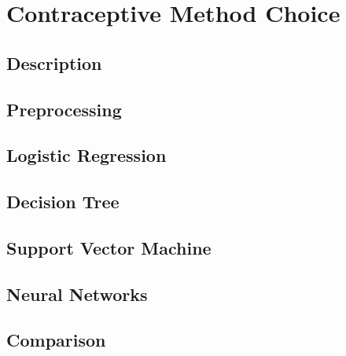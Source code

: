 \section{Contraceptive Method Choice}
\label{db:sec:ds1}
\subsection{Description}

\subsection{Preprocessing}

\subsection{Logistic Regression}

\subsection{Decision Tree}

\subsection{Support Vector Machine}

\subsection{Neural Networks}

\subsection{Comparison}

